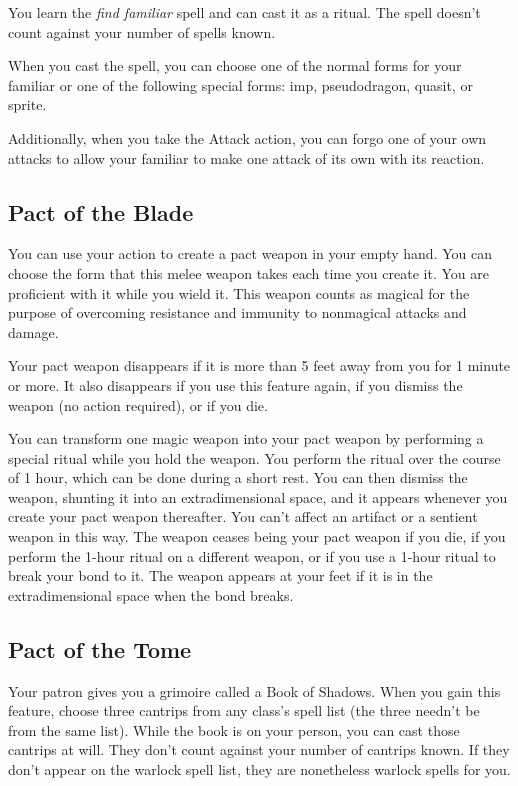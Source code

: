 You learn the \textit{find familiar} spell and can cast it as a ritual. The spell doesn't count against your number of spells known.

When you cast the spell, you can choose one of the normal forms for your familiar or one of the following special forms: imp, pseudodragon, quasit, or sprite.

Additionally, when you take the Attack action, you can forgo one of your own attacks to allow your familiar to make one attack of its own with its reaction.

\subsection{Pact of the Blade}

You can use your action to create a pact weapon in your empty hand. You can choose the form that this melee weapon takes each time you create it. You are proficient with it while you wield it. This weapon counts as magical for the purpose of overcoming resistance and immunity to nonmagical attacks and damage.

Your pact weapon disappears if it is more than 5 feet away from you for 1 minute or more. It also disappears if you use this feature again, if you dismiss the weapon (no action required), or if you die.

You can transform one magic weapon into your pact weapon by performing a special ritual while you hold the weapon. You perform the ritual over the course of 1 hour, which can be done during a short rest. You can then dismiss the weapon, shunting it into an extradimensional space, and it appears whenever you create your pact weapon thereafter. You can't affect an artifact or a sentient weapon in this way. The weapon ceases being your pact weapon if you die, if you perform the 1-hour ritual on a different weapon, or if you use a 1-hour ritual to break your bond to it. The weapon appears at your feet if it is in the extradimensional space when the bond breaks.

\subsection{Pact of the Tome}

Your patron gives you a grimoire called a Book of Shadows. When you gain this feature, choose three cantrips from any class's spell list (the three needn't be from the same list). While the book is on your person, you can cast those cantrips at will. They don't count against your number of cantrips known. If they don't appear on the warlock spell list, they are nonetheless warlock spells for you.


